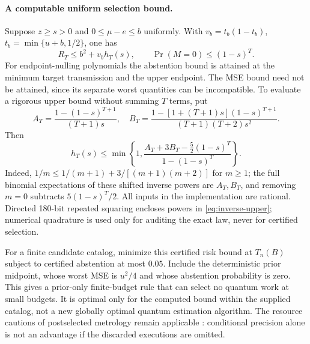 \paragraph{A computable uniform selection bound.}
Suppose $z\geq s>0$ and $0\leq\mu-e\leq b$ uniformly. With
$v_b=t_b(1-t_b)$, $t_b=\min\{u+b,1/2\}$, one has
\begin{equation}\label{eq:finite-upper}
 R_T\leq b^2+v_bh_T(s),\qquad
 \Pr(M=0)\leq(1-s)^T.
\end{equation}
For endpoint-nulling polynomials the abstention bound is attained at the
minimum target transmission and the upper endpoint. The MSE bound need
not be attained, since its separate worst quantities can be incompatible.
To evaluate a rigorous upper bound without summing $T$ terms, put
\[
 A_T=\frac{1-(1-s)^{T+1}}{(T+1)s},\quad
 B_T=\frac{1-[1+(T+1)s](1-s)^{T+1}}{(T+1)(T+2)s^2}.
\]
Then
\begin{equation}\label{eq:inverse-upper}
 h_T(s)\leq\min\left\{1,
 \frac{A_T+3B_T-\frac52(1-s)^T}{1-(1-s)^T}\right\}.
\end{equation}
Indeed, $1/m\leq1/(m+1)+3/[(m+1)(m+2)]$ for $m\geq1$;
the full binomial expectations of these shifted inverse powers are
$A_T,B_T$, and removing $m=0$ subtracts $5(1-s)^T/2$.
All inputs in the implementation are rational. Directed 180-bit repeated
squaring encloses powers in \eqref{eq:inverse-upper}; numerical quadrature
is used only for auditing the exact law, never for certified selection.

For a finite candidate catalog, minimize this certified risk bound at
$T_n(B)$ subject to certified abstention at most $0.05$.
Include the deterministic prior midpoint, whose worst MSE is $u^2/4$
and whose abstention probability is zero. This gives a prior-only
finite-budget rule that can select no quantum work at small budgets.
It is optimal only for the computed bound within the supplied catalog,
not a new globally optimal quantum estimation algorithm.
The resource cautions of postselected metrology remain applicable
\cite{Combes}: conditional precision alone is not an advantage if the
discarded executions are omitted.
